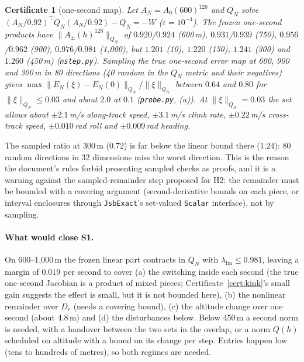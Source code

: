 \documentclass[11pt]{article}
\newtheorem{cert}{Certificate}
\begin{document}
\begin{cert}[one-second map]\label{cert:nstep}
Let $A_N = A_0(600)^{128}$ and $Q_N$ solve $(A_N/0.92)^\top Q_N (A_N/0.92) - Q_N = -W$ ($\varepsilon = 10^{-4}$). The frozen one-second products have $\|A_\pm(h)^{128}\|_{Q_N}$ of $0.920$/$0.924$ (600\,m), $0.931$/$0.939$ (750), $0.956$/$0.962$ (900), $0.976$/$0.981$ (1{,}000), but $1.201$ (10), $1.220$ (150), $1.241$ (300) and $1.260$ (450\,m) (\texttt{nstep.py}). Sampling the true one-second error map at 600, 900 and 300\,m in 80 directions (40 random in the $Q_N$ metric and their negatives) gives $\max \|E_N(\xi) - E_N(0)\|_{Q_N} / \|\xi\|_{Q_N}$ between $0.64$ and $0.80$ for $\|\xi\|_{Q_N} \le 0.03$ and about $2.0$ at $0.1$ (\texttt{probe.py}, (a)). At $\|\xi\|_{Q_N} = 0.03$ the set allows about $\pm 2.1$\,m/s along-track speed, $\pm 3.1$\,m/s climb rate, $\pm 0.22$\,m/s cross-track speed, $\pm 0.010$\,rad roll and $\pm 0.009$\,rad heading.
\end{cert}

The sampled ratio at 300\,m ($0.72$) is far below the linear bound there ($1.24$): 80 random directions in 32 dimensions miss the worst direction. This is the reason the document's rules forbid presenting sampled checks as proofs, and it is a warning against the sampled-remainder step proposed for H2: the remainder must be bounded with a covering argument (second-derivative bounds on each piece, or interval enclosures through \texttt{JsbExact}'s set-valued \texttt{Scalar} interface), not by sampling.

\paragraph{What would close S1.} On 600--1{,}000\,m the frozen linear part contracts in $Q_N$ with $\lambda_{\mathrm{lin}} \le 0.981$, leaving a margin of $0.019$ per second to cover (a) the switching inside each second (the true one-second Jacobian is a product of mixed pieces; Certificate~\ref{cert:kink}'s small gain suggests the effect is small, but it is not bounded here), (b) the nonlinear remainder over $D_r$ (needs a covering bound), (c) the altitude change over one second (about 4.8\,m) and (d) the disturbances below. Below 450\,m a second norm is needed, with a handover between the two sets in the overlap, or a norm $Q(h)$ scheduled on altitude with a bound on its change per step. Entries happen low (tens to hundreds of metres), so both regimes are needed.
\end{document}
